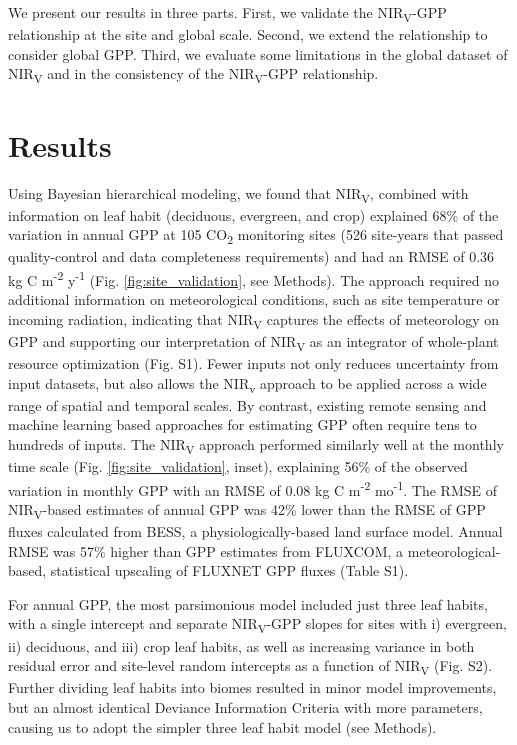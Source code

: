\documentclass[10pt,letterpaper]{article}
\begin{document}
We present our results in three parts. First, we validate the NIR\textsubscript{V}-GPP relationship at the site and global scale. Second, we extend the relationship to consider global GPP. Third, we evaluate some limitations in the global dataset of NIR\textsubscript{V} and in the consistency of the NIR\textsubscript{V}-GPP relationship. 

\section*{Results}
Using Bayesian hierarchical modeling, we found that NIR\textsubscript{V}, combined with information on leaf habit (deciduous, evergreen, and crop) explained 68\% of the variation in annual GPP at 105 CO\textsubscript{2} monitoring sites (526 site-years that passed quality-control and data completeness requirements) and had an RMSE of 0.36 kg C m\textsuperscript{-2} y\textsuperscript{-1} (Fig. \ref{fig:site_validation}, see Methods). The approach required no additional information on meteorological conditions, such as site temperature or incoming radiation, indicating that NIR\textsubscript{V} captures the effects of meteorology on GPP and supporting our interpretation of NIR\textsubscript{V} as an integrator of whole-plant resource optimization (Fig. S1). Fewer inputs not only reduces uncertainty from input datasets, but also allows the NIR\textsubscript{v} approach to be applied across a wide range of spatial and temporal scales. By contrast, existing remote sensing and machine learning based approaches for estimating GPP often require tens to hundreds of inputs.  The NIR\textsubscript{V} approach performed similarly well at the monthly time scale (Fig. \ref{fig:site_validation}, inset), explaining 56\% of the observed variation in monthly GPP with an RMSE of 0.08 kg C m\textsuperscript{-2} mo\textsuperscript{-1}. The RMSE of NIR\textsubscript{V}-based estimates of annual GPP was 42\% lower than the RMSE of GPP fluxes calculated from BESS, a physiologically-based land surface model. Annual RMSE was 57\% higher than GPP estimates from  FLUXCOM, a meteorological-based, statistical upscaling of FLUXNET GPP fluxes (Table S1).  

For annual GPP, the most parsimonious model included just three leaf habits, with a single intercept and separate NIR\textsubscript{V}-GPP slopes for sites with i) evergreen, ii) deciduous, and iii) crop leaf habits, as well as increasing variance in both residual error and site-level random intercepts as a function of NIR\textsubscript{V} (Fig. S2). Further dividing leaf habits into biomes resulted in minor model improvements, but an almost identical Deviance Information Criteria with more parameters, causing us to adopt the simpler three leaf habit model (see Methods). 
\end{document}
